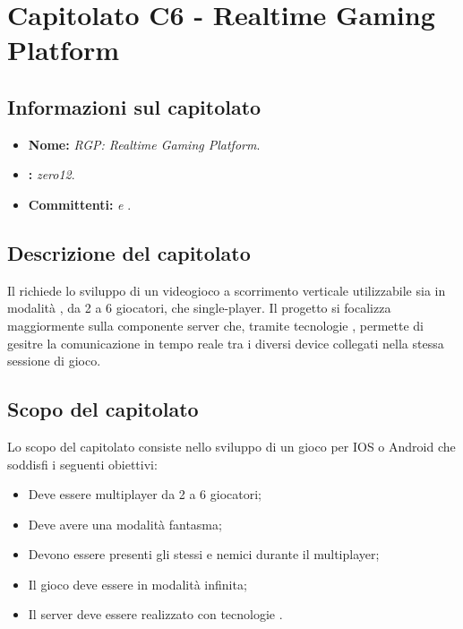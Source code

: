 \section{Capitolato C6 - Realtime Gaming Platform}
\label{C6}
\subsection{Informazioni sul capitolato}
\begin{itemize}
	\item \textbf{Nome:} \textit{RGP: Realtime Gaming Platform}.
	\item \textbf{:} \textit{zero12}.
	\item \textbf{Committenti:} \textit{\VT{} e \CR{}}.
\end{itemize}

\subsection{Descrizione del capitolato}
Il  richiede lo sviluppo di un videogioco a scorrimento verticale utilizzabile sia in modalità , da 2 a 6 giocatori, che single-player. Il progetto si focalizza maggiormente sulla componente server che, tramite tecnologie , permette di gesitre la comunicazione in tempo reale tra i diversi device collegati nella stessa sessione di gioco.

\subsection{Scopo del capitolato}
Lo scopo del capitolato consiste nello sviluppo di un gioco per IOS o Android che soddisfi i seguenti obiettivi:
\begin{itemize}
	\item Deve essere multiplayer da 2 a 6 giocatori;
	\item Deve avere una modalità fantasma;
	\item Devono essere presenti gli stessi  e nemici durante il multiplayer;
	\item Il gioco deve essere in modalità infinita;
	\item Il server deve essere realizzato con tecnologie \textit{}.
\end{itemize}

